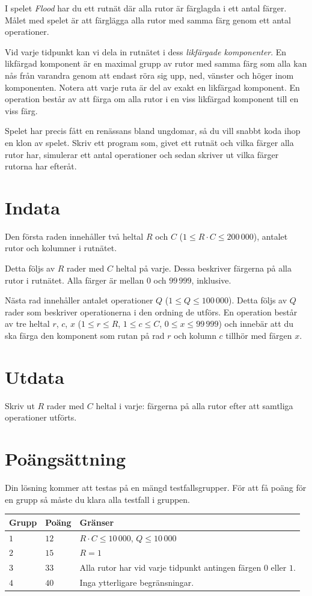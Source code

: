 I spelet \emph{Flood} har du ett rutnät där alla rutor är färglagda i ett antal färger.
Målet med spelet är att färglägga alla rutor med samma färg genom ett antal operationer.

Vid varje tidpunkt kan vi dela in rutnätet i dess \emph{likfärgade komponenter}.
En likfärgad komponent är en maximal grupp av rutor med samma färg som alla kan nås från varandra genom att endast röra sig upp, ned, vänster och höger inom komponenten.
Notera att varje ruta är del av exakt en likfärgad komponent.
En operation består av att färga om alla rutor i en viss likfärgad komponent till en viss färg.

Spelet har precis fått en renässans bland ungdomar, så du vill snabbt koda ihop en klon av spelet.
Skriv ett program som, givet ett rutnät och vilka färger alla rutor har, simulerar ett antal operationer och sedan skriver ut vilka färger rutorna har efteråt.

\section*{Indata}
Den första raden innehåller två heltal $R$ och $C$ ($1 \le R \cdot C \le 200\,000$), antalet rutor och kolumner i rutnätet.

Detta följs av $R$ rader med $C$ heltal på varje.
Dessa beskriver färgerna på alla rutor i rutnätet.
Alla färger är mellan $0$ och $99\,999$, inklusive.

Nästa rad innehåller antalet operationer $Q$ ($1 \le Q \le 100\,000$).
Detta följs av $Q$ rader som beskriver operationerna i den ordning de utförs.
En operation består av tre heltal $r$, $c$, $x$ ($1 \le r \le R$, $1 \le c \le C$, $0 \le x \le 99\,999$) och innebär att du ska färga den komponent som rutan på rad $r$ och kolumn $c$ tillhör med färgen $x$.

\section*{Utdata}
Skriv ut $R$ rader med $C$ heltal i varje: färgerna på alla rutor efter att samtliga operationer utförts.

\section*{Poängsättning}
Din lösning kommer att testas på en mängd testfallsgrupper.
För att få poäng för en grupp så måste du klara alla testfall i gruppen.

\noindent
\begin{tabular}{| l | l | p{12cm} |}
  \hline
  \textbf{Grupp} & \textbf{Poäng} & \textbf{Gränser} \\ \hline
    $1$   & $12$      & $R \cdot C \le 10\,000$, $Q \le 10\,000$ \\ \hline
    $2$   & $15$     & $R = 1$ \\ \hline
    $3$   & $33$     & Alla rutor har vid varje tidpunkt antingen färgen $0$ eller $1$. \\ \hline
    $4$   & $40$     & Inga ytterligare begränsningar. \\ \hline
\end{tabular}

